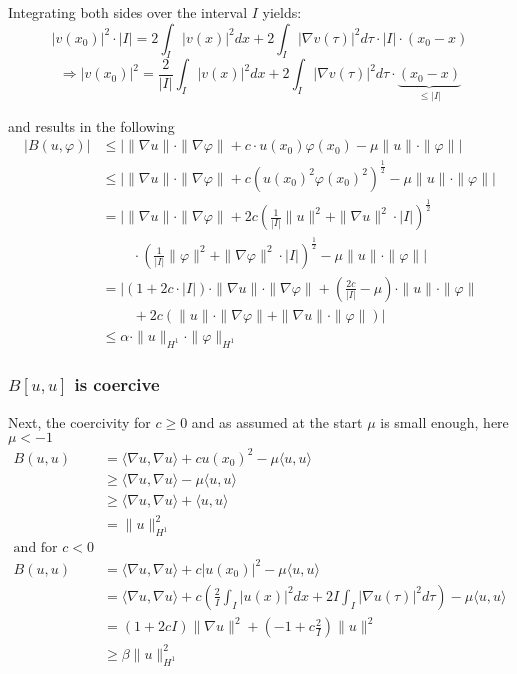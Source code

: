 \documentclass[14pt,a4paper]{scrartcl}
\numberwithin{equation}{section}
\begin{document}
Integrating both sides over the interval $I$ yields:
	\[	|v(x_{0})|^{2} \cdot |I| = 2 \int_{I} |v(x)|^{2} dx + 2 \int_{I} \left| \nabla  v(\tau) \right|^{2} d\tau \cdot |I| \cdot (x_{0} - x) \]
	\[ \Rightarrow |v(x_{0})|^{2} = \frac{2}{|I|} \int_{I} |v(x)|^{2} dx + 2 \int_{I} \left| \nabla v(\tau) \right|^{2} d\tau \cdot \underbrace{(x_{0} - x)}_{\leq |I|} \] 
	
and results in the following
\begin{align*}
	| B(u, \varphi)| & \leq \big| \| \nabla u \| \cdot \| \nabla \varphi \| + c \cdot u(x_{0}) \varphi(x_{0}) - \mu \| u \| \cdot \| \varphi\| \big|	 \\
		& \leq \big| \| \nabla u \| \cdot \| \nabla \varphi \| + c \left( u(x_{0})^{2} \varphi(x_{0})^{2} \right)^{\frac{1}{2}} - \mu \| u \| \cdot \| \varphi\| \big|	\\
		& =  \big| \| \nabla u \| \cdot \| \nabla \varphi \|+ 2 c \left( \frac{1}{|I|} \|u\|^{2} + \| \nabla u \|^{2} \cdot |I| \right)^{\frac{1}{2}} \\
		& ~\qquad \cdot \left( \frac{1}{|I|} \|\varphi \|^{2} + \| \nabla \varphi \|^{2}  \cdot |I| \right)^{\frac{1}{2}} - \mu \| u \| \cdot \| \varphi\| \big| \\
		& = \big| (1 + 2c\cdot|I|) \cdot \| \nabla u \| \cdot \| \nabla \varphi \| + (\frac{2c}{|I|} - \mu) \cdot \| u \| \cdot \| \varphi\| \\
		& ~\qquad + 2c \left( \|u\| \cdot \| \nabla \varphi \| + \| \nabla u \| \cdot \| \varphi \| \right) \big| \\
		& \leq \alpha \cdot \| u \|_{H^{1}} \cdot \| \varphi \|_{H^{1}} 
		\tag*{$\qed$}
\end{align*}

\subsubsection{$B[u,u]$ is coercive}
Next, the coercivity for $ c \geq 0$ and as assumed at the start $\mu$ is small enough, here $\mu < -1$
\begin{align*}
	B(u, u) & = \langle \nabla u, \nabla u \rangle + c u(x_{0})^{2} - \mu \langle u , u \rangle \\
		& \geq \langle \nabla u, \nabla u \rangle - \mu \langle u , u \rangle \\
		& \geq \langle \nabla u, \nabla u \rangle  + \langle u , u \rangle \\
		& = \| u \|_{H^{1}}^{2} \\
\text{and for $c < 0$} \\
	B(u, u) & = \langle \nabla u, \nabla u \rangle + c |u(x_{0})|^{2} - \mu \langle u , u \rangle \\
		& = \langle \nabla u, \nabla u \rangle + c \left( \frac{2}{I} \int_{I} |u(x)|^{2} dx + 2 I \int_{I} |\nabla u(\tau)|^{2} d\tau \right) - \mu \langle u , u \rangle  \\
		& = (1 + 2 c I) \| \nabla u \|^{2} + (- 1 + c \frac{2}{I}) \| u \|^{2}  \\
		& \geq \beta \| u \|_{H^{1}}^{2}
		\tag*{$\qed$}
\end{align*}
\end{document}
